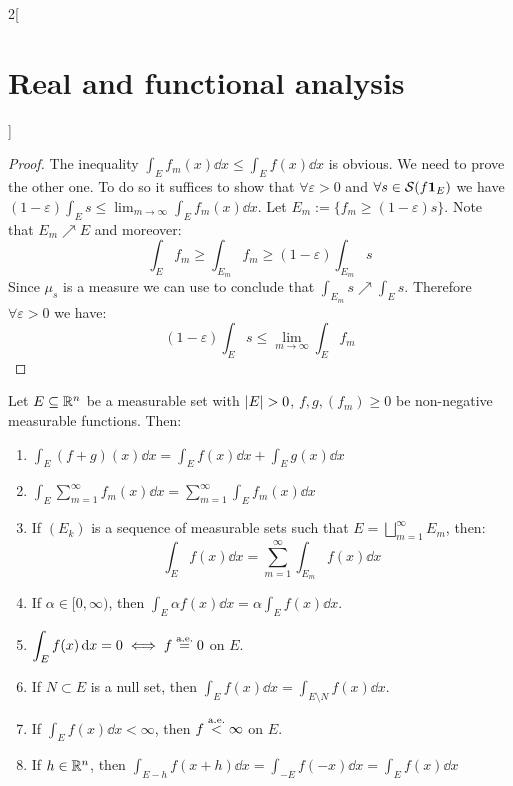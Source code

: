 \documentclass[../../../main_math.tex]{subfiles}
\begin{document}
\begin{multicols}{2}[\section{Real and functional analysis}]
\begin{important}
  \end{important}
  \begin{proof}
    The inequality $\int_Ef_m(x)\dd{x}\leq \int_Ef(x)\dd{x}$ is obvious. We need to prove the other one. To do so it suffices to show that $\forall \varepsilon>0$ and $\forall s\in\mathcal{S}(f\boldsymbol{\mathrm{1}}_{E})$ we have $(1-\varepsilon)\int_E s\leq {\displaystyle\lim_{m\to\infty}}\int_Ef_m(x)\dd{x}$.
    Let $E_m:=\{f_m\geq (1-\varepsilon)s\}$. Note that $E_m\nearrow E$ and moreover:
    $$\int_Ef_m\geq\int_{E_m}f_m\geq(1-\varepsilon)\int_{E_m}s$$
    Since $\mu_s$ is a measure we can use  to conclude that $\int_{E_m}s\nearrow \int_{E}s$. Therefore $\forall\varepsilon>0$ we have: $$(1-\varepsilon)\int_{E}s\leq \lim_{m\to\infty}\int_Ef_m$$
  \end{proof}
  \begin{proposition}
    Let $E\subseteq\mathbb{R}^n$ be a measurable set with $\m{E}>0$, $f, g, (f_m)\geq 0$ be non-negative measurable functions. Then:
    \begin{enumerate}
      \item\label{RFA:postmonotoneA} $\displaystyle\int_E (f+g)(x)\dd{x}=\int_Ef(x)\dd{x}+\int_Eg(x)\dd{x}$
      \item\label{RFA:postmonotoneB} $\displaystyle\int_E\sum_{m=1}^\infty f_m(x)\dd{x}=\sum_{m=1}^\infty\int_E f_m(x)\dd{x}$
      \item\label{RFA:postmonotoneC} If $(E_k)$ is a sequence of measurable sets such that $E=\bigsqcup_{m=1}^\infty E_m$, then: $$\int_Ef(x)\dd{x}=\sum_{m=1}^\infty\int_{E_m}f(x)\dd{x}$$
      \item\label{RFA:postmonotoneD} If $\alpha\in[0,\infty)$, then $\displaystyle\int_E\alpha f(x)\dd{x}=\alpha\int_Ef(x)\dd{x}$.
      \item\label{RFA:postmonotoneE} $\displaystyle\int_Ef(x)\dd{x}=0\iff f\overset{\text{a.e.}}{=}0$ on $E$.
      \item\label{RFA:postmonotoneF} If $N\subset E$ is a null set, then $\displaystyle\int_Ef(x)\dd{x}=\int_{E\setminus N}f(x)\dd{x}$.
      \item\label{RFA:postmonotoneG} If $\displaystyle\int_Ef(x)\dd{x}<\infty$, then $f\overset{\text{a.e.}}{<}\infty$ on $E$.
      \item\label{RFA:postmonotoneH} If $h\in\mathbb{R}^n$, then $\displaystyle\int_{E-h}f(x+h)\dd{x}=\int_{-E}f(-x)\dd{x}=\int_{E}f(x)\dd{x}$
    \end{enumerate}
  \end{proposition}
  \begin{sproof}

\end{sproof}
\end{multicols}
\end{document}
